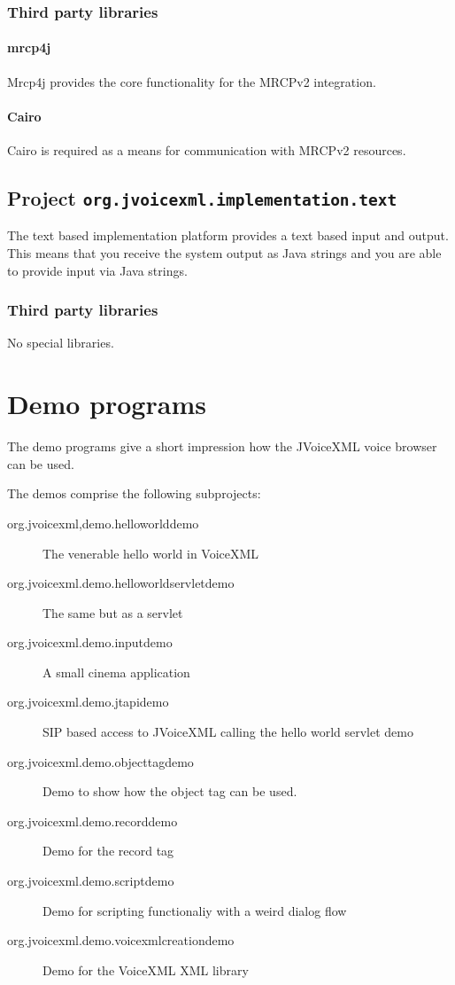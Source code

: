 \documentclass[11pt,a4paper]{article}
\begin{document}
\subsubsection{Third party libraries}
\label{sec:mrcpv2-third-party-libr}

\paragraph{mrcp4j}

Mrcp4j provides the core functionality for the MRCPv2 integration.

\paragraph{Cairo}

Cairo is required as a means for communication with MRCPv2 resources.

\subsection{Project \lstinline{org.jvoicexml.implementation.text}}

The text based implementation platform provides a text based input and output.
This means that you receive the system output as Java strings and you are able
to provide input via Java strings.

\subsubsection{Third party libraries}
\label{sec:text-third-party-libr}

No special libraries.

\section{Demo programs}

The demo programs give a short impression how the JVoiceXML voice browser can
be used.

The demos comprise the following subprojects:

\begin{description}
\item[org.jvoicexml,demo.helloworlddemo] The venerable hello world in VoiceXML
\item[org.jvoicexml.demo.helloworldservletdemo] The same but as a servlet
\item[org.jvoicexml.demo.inputdemo] A small cinema application
\item[org.jvoicexml.demo.jtapidemo] SIP based access to JVoiceXML calling the
hello world servlet demo
\item[org.jvoicexml.demo.objecttagdemo] Demo to show how the object tag can be
used.
\item[org.jvoicexml.demo.recorddemo] Demo for the record tag
\item[org.jvoicexml.demo.scriptdemo] Demo for scripting functionaliy with a
weird dialog flow
\item[org.jvoicexml.demo.voicexmlcreationdemo] Demo for the VoiceXML XML library
\end{description}
\end{document}
